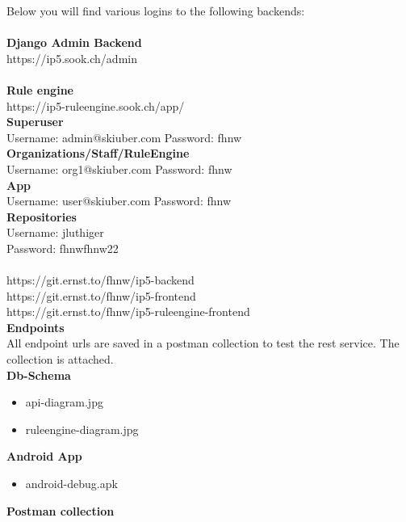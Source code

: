\documentclass[11pt]{article} %
\begin{document}
\newpage
\begin{appendices}
Below you will find various logins to the following backends:\\
\\
\textbf{Django Admin Backend}\\
https://ip5.sook.ch/admin\\
\\
\textbf{Rule engine}\\
https://ip5-ruleengine.sook.ch/app/\\

\textbf{Superuser}\\
Username: admin@skiuber.com
Password: fhnw\\

\textbf{Organizations/Staff/RuleEngine}\\
Username: org1@skiuber.com
Password: fhnw\\

\textbf{App}\\
Username: user@skiuber.com
Password: fhnw\\

\textbf{Repositories}\\
Username: jluthiger\\
Password: fhnwfhnw22\\
\\
https://git.ernst.to/fhnw/ip5-backend\\
https://git.ernst.to/fhnw/ip5-frontend\\
https://git.ernst.to/fhnw/ip5-ruleengine-frontend\\


\textbf{Endpoints}\\
All endpoint urls are saved in a postman collection to test the rest service. The collection is attached.\\

\textbf{Db-Schema}\\

\begin{itemize}
  \item api-diagram.jpg
  \item ruleengine-diagram.jpg
\end{itemize}

\textbf{Android App}\\

\begin{itemize}
  \item android-debug.apk
\end{itemize}
\newpage
\textbf{Postman collection}\\



\end{appendices}
\end{document}
